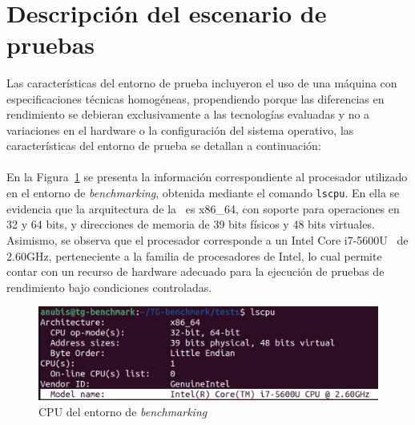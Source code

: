 \label{cap:benchmarking}

\mbox{}\\
\section{Descripción del escenario de pruebas}
\noindent
Las características del entorno de prueba incluyeron el uso de una máquina con especificaciones técnicas homogéneas, propendiendo  porque las diferencias en rendimiento se debieran exclusivamente a las tecnologías evaluadas y no a variaciones en el hardware o la configuración del sistema operativo, las características del entorno de prueba se detallan a continuación:\\ \\
\noindent
En la Figura~\ref{fig:CPU-benchmarking} se presenta la información correspondiente al procesador utilizado en el entorno de \textit{benchmarking}, obtenida mediante el comando \texttt{lscpu}. En ella se evidencia que la arquitectura de la \CPU\ es x86\_64, con soporte para operaciones en 32 y 64 bits, y direcciones de memoria de 39 bits físicos y 48 bits virtuales. Asimismo, se observa que el procesador corresponde a un Intel Core i7-5600U \CPU\ de 2.60GHz, perteneciente a la familia de procesadores de Intel, lo cual permite contar con un recurso de hardware adecuado para la ejecución de pruebas de rendimiento bajo condiciones controladas.
\begin{figure}[H]
    \centering
    \includegraphics[width=\textwidth,height=0.85\textheight,keepaspectratio]{apendices/ENV-BENCH/CPU.png}
    \caption{CPU del entorno de \textit{benchmarking}}\label{fig:CPU-benchmarking}
\end{figure}

